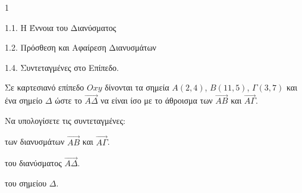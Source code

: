 \begin{ylh}{1}
    \item 1.1. Η Έννοια του Διανύσματος
    \item 1.2. Πρόσθεση και Αφαίρεση Διανυσμάτων
    \item 1.4. Συντεταγμένες στο Επίπεδο.
\end{ylh}
\begin{figure}
\end{figure}
Σε καρτεσιανό επίπεδο $Oxy$ δίνονται τα σημεία $A(2,4)$, $B(11,5)$, $\Gamma(3,7)$ και ένα σημείο $\Delta$ ώστε το $\vec{A\Delta}$ να είναι ίσο με το άθροισμα των $\vec{AB}$ και $\vec{A\Gamma}$.

Να υπολογίσετε τις συντεταγμένες:
\begin{alist}
    \item των διανυσμάτων $\vec{AB}$ και $\vec{A\Gamma}$. 
    \item του διανύσματος $\vec{A\Delta}$. 
    \item του σημείου $\Delta$. 
\end{alist}